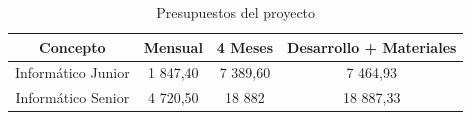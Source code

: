 \renewcommand{\arraystretch}{1.5} %

\begin{table}[H]
    \centering
    \begin{tabular}{|c|c|c|c|}
        \hline
        \textbf{Concepto}  & \textbf{Mensual} & \textbf{4 Meses} & \textbf{Desarrollo + Materiales} \\
        \hline
        Informático Junior & 1 847,40 \EUR{}  & 7 389,60 \EUR{}  & 7 464,93 \EUR{}                  \\
        \hline
        Informático Senior & 4 720,50 \EUR{}  & 18 882 \EUR{}    & 18 887,33 \EUR{}                 \\
        \hline
    \end{tabular}
    \caption{Presupuestos del proyecto}
    \label{tab:presupuesto-proyecto}
\end{table}

\renewcommand{\arraystretch}{1} %